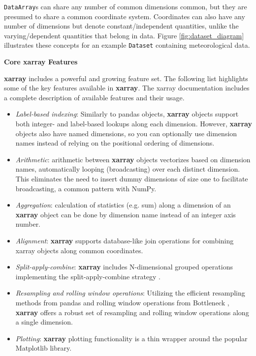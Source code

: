 \documentclass{jors}
\begin{document}
\verb|DataArray|s can share any number of common dimensions common, but they are presumed to share a common coordinate system.
Coordinates can also have any number of dimensions but denote constant/independent quantities, unlike the varying/dependent quantities that belong in data.
Figure \ref{fig:dataset_diagram} illustrates these concepts for an example \verb|Dataset| containing meteorological data.

\textbf{Core xarray Features}

\textbf{xarray} includes a powerful and growing feature set.
The following list highlights some of the key features available in \textbf{xarray}.
The xarray documentation \citep{xarray_docs} includes a complete description of available features and their usage.

\begin{itemize}
	\item \textit{Label-based indexing}: Similarly to pandas objects, \textbf{xarray} objects support both integer- and label-based lookups along each dimension.
	However, \textbf{xarray} objects also have named dimensions, so you can optionally use dimension names instead of relying on the positional ordering of dimensions.
	\item \textit{Arithmetic}: arithmetic between \textbf{xarray} objects vectorizes based on dimension names, automatically looping (broadcasting) over each distinct dimension. This eliminates the need to insert dummy dimensions of size one to facilitate broadcasting, a common pattern with NumPy.
	\item \textit{Aggregation}: calculation of statistics (e.g. sum) along a dimension of an \textbf{xarray} object can be done by dimension name instead of an integer axis number.
	\item \textit{Alignment}: \textbf{xarray} supports database-like join operations for combining xarray objects along common coordinates.
	\item \textit{Split-apply-combine}: \textbf{xarray} includes N-dimensional grouped operations implementing the split-apply-combine strategy \citep{wickham_2011}.
	\item \textit{Resampling and rolling window operations}: Utilizing the efficient resampling methods from pandas and rolling window operations from Bottleneck \citep{Bottleneck}, \textbf{xarray} offers a robust set of resampling and rolling window operations along a single dimension.
	\item \textit{Plotting}: \textbf{xarray} plotting functionality is a thin wrapper around the popular Matplotlib library.

\end{itemize}
\end{document}
